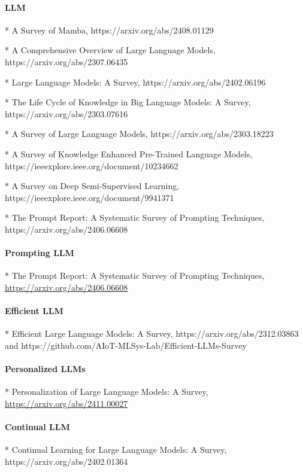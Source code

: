 \paragraph{LLM}

* A Survey of Mamba, https://arxiv.org/abs/2408.01129

* A Comprehensive Overview of Large Language Models, https://arxiv.org/abs/2307.06435

* Large Language Models: A Survey, https://arxiv.org/abs/2402.06196

* The Life Cycle of Knowledge in Big Language Models: A Survey, https://arxiv.org/abs/2303.07616

* A Survey of Large Language Models, https://arxiv.org/abs/2303.18223

* A Survey of Knowledge Enhanced Pre-Trained Language Models, https://ieeexplore.ieee.org/document/10234662

* A Survey on Deep Semi-Supervised Learning, https://ieeexplore.ieee.org/document/9941371

* The Prompt Report: A Systematic Survey of Prompting Techniques, https://arxiv.org/abs/2406.06608

\paragraph{Prompting LLM}

* The Prompt Report: A Systematic Survey of Prompting Techniques, \url{https://arxiv.org/abs/2406.06608}

\paragraph{Efficient LLM}

* Efficient Large Language Models: A Survey, https://arxiv.org/abs/2312.03863 and https://github.com/AIoT-MLSys-Lab/Efficient-LLMs-Survey

\paragraph{Personalized LLMs}

* Personalization of Large Language Models: A Survey, \url{https://arxiv.org/abs/2411.00027}

\paragraph{Continual LLM}

* Continual Learning for Large Language Models: A Survey, https://arxiv.org/abs/2402.01364

